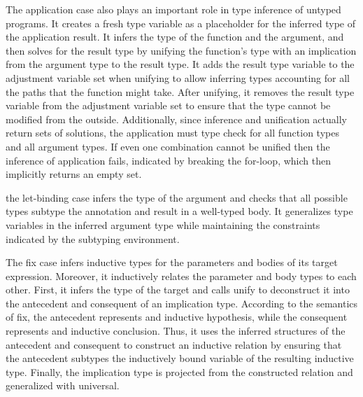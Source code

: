 \documentclass[acmsmall]{acmart}
\theoremstyle{definition}
\begin{document}
The application case also plays an important role in type inference of untyped programs.
It creates a fresh type variable as a placeholder for the inferred type of the application result.
It infers the type of the function and the argument, and then solves for the result type
by unifying the function's type with an implication from the argument type to the result type.
It adds the result type variable to the adjustment variable set when unifying to allow inferring 
types accounting for all the paths that the function might take.
After unifying, it removes the result type variable from the adjustment variable set to ensure
that the type cannot be modified from the outside.
Additionally, since inference and unification actually return sets of solutions,
the application must type check for all function types and all argument types.
If even one combination cannot be unified then the inference of application fails,
indicated by breaking the for-loop, which then implicitly returns an empty set.  


the let-binding case infers the type of the argument and checks that
all possible types subtype the annotation and result in a well-typed body. 
It generalizes type variables in the inferred argument type while maintaining
the constraints indicated by the subtyping environment. 



The fix case infers inductive types for the parameters and bodies of its
target expression. Moreover, it inductively relates the parameter and body types to each other.
First, it infers the type of the target and calls unify to deconstruct it into the antecedent
and consequent of an implication type. According to the semantics of fix, the antecedent
represents and inductive hypothesis, while the consequent represents and inductive conclusion.
Thus, it uses the inferred structures of the antecedent and consequent to construct an 
inductive relation by ensuring that the antecedent subtypes the inductively bound variable of 
the resulting inductive type.
Finally, the implication type is projected from the constructed relation and generalized with universal.

\hfill
\end{document}
